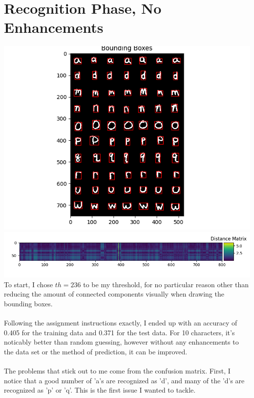 \documentclass[12pt]{article}
\begin{document}
\section*{Recognition Phase, No Enhancements}
\includegraphics*[scale=0.5]{testBounds} \\
\includegraphics*[scale=0.5]{Dplotted} \\
To start, I chose $th = 236$ to be my threshold, for no particular reason other 
than reducing the amount of connected components visually when drawing the bounding boxes. 
\\
\\
Following the assignment instructions exactly, I ended up with an accuracy of 0.405 
for the training data and 0.371 for the test data. For 10 characters, it's noticably better than 
random guessing, however without any enhancements to the data set or the method of prediction, it 
can be improved. 
\\
\\
The problems that stick out to me come from the confusion matrix. First, I notice that a good number of 
'a's are recognized as 'd', and many of the 'd's are recognized as 'p' or 'q'. This is the first issue I wanted to 
tackle. 
\end{document}
